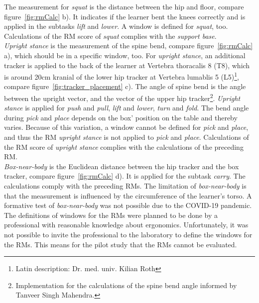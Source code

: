 The measurement for \textit{squat} is the distance between the hip and floor, compare figure~\ref{fig:rmCalc} b). It indicates if the learner bent the knees correctly and is applied in the subtasks \textit{lift} and \textit{lower}. A window is defined for \textit{squat}, too. Calculations of the RM score of \textit{squat} complies with the \textit{support base}.\\
\textit{Upright stance} is the measurement of the spine bend, compare figure~\ref{fig:rmCalc} a), which should be in a specific window, too. For \textit{upright stance}, an additional tracker is applied to the back of the learner at Vertebra thoracalis 8 (T8), which is around 20cm kranial of the lower hip tracker at Vertebra lumablis 5 (L5)\footnote{Latin description: Dr. med. univ. Kilian Roth}, compare figure~\ref{fig:tracker_placement} c). The angle of spine bend is the angle between the upright vector, and the vector of the upper hip tracker\footnote{Implementation for the calculations of the spine bend angle informed by Tanveer Singh Mahendra.}. \textit{Upright stance} is applied for \textit{push} and \textit{pull}, \textit{lift} and \textit{lower}, \textit{turn} and \textit{fold}. The bend angle during \textit{pick} and \textit{place} depends on the box' position on the table and thereby varies. Because of this variation, a window cannot be defined for \textit{pick} and \textit{place}, and thus the RM \textit{upright stance} is not applied to \textit{pick} and \textit{place}. Calculations of the RM score of \textit{upright stance} complies with the calculations of the preceding RM.\\
\textit{Box-near-body} is the Euclidean distance between the hip tracker and the box tracker, compare figure~\ref{fig:rmCalc} d). It is applied for the subtask \textit{carry}. The calculations comply with the preceding RMs. The limitation of \textit{box-near-body} is that the measurement is influenced by the circumference of the learner's torso. A formative test of \textit{box-near-body} was not possible due to the COVID-19 pandemic.\\

The definitions of windows for the RMs were planned to be done by a professional with reasonable knowledge about ergonomics. Unfortunately, it was not possible to invite the professional to the laboratory to define the windows for the RMs. This means for the pilot study that the RMs cannot be evaluated.

